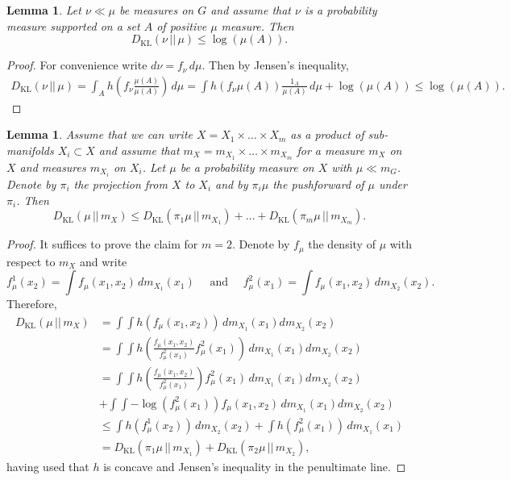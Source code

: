 \documentclass[10pt, english,oneside,reqno]{amsart}
\theoremstyle{plain}
\newtheorem{lemma}[theorem]{Lemma}
\theoremstyle{remark}
\numberwithin{equation}{section}
\numberwithin{figure}{section}
\newcommand{\Haarof}[1]{m_{#1}}
\begin{document}
\begin{lemma}\label{KLSupportBound}
    Let $\nu \ll \mu$ be measures on $G$ and assume that $\nu$ is a probability measure supported on a set $A$ of positive $\mu$ measure. Then $$D_{\mathrm{KL}}(\nu \, || \, \mu) \leq \log(\mu(A)).$$
\end{lemma}

\begin{proof}
    For convenience write $d\nu = f_{\nu}\, d\mu$. Then by Jensen's inequality,
    \begin{align*}
        D_{\mathrm{KL}}(\nu \, || \, \mu) = \int_A h\left(f_{\nu} \frac{\mu(A)}{\mu(A)} \right) \, d\mu = \int h(f_{\nu}\mu(A)) \frac{1_A}{\mu(A)} \, d\mu + \log(\mu(A)) \leq  \log(\mu(A)).
    \end{align*}
\end{proof}

\begin{lemma}\label{EntProductBound}
    Assume that we can write $X = X_1 \times \ldots \times X_m$ as a product of sub-manifolds $X_i\subset X$ and assume that $\Haarof{X} = \Haarof{X_1} \times \ldots \times \Haarof{X_m}$ for a measure $\Haarof{X}$ on $X$ and measures $\Haarof{X_i}$ on $X_i$. Let $\mu$ be a probability measure on $X$ with $\mu \ll \Haarof{G}$. Denote by $\pi_i$ the projection from $X$ to $X_i$ and by $\pi_i \mu$ the pushforward of $\mu$ under $\pi_i$. Then $$D_{\mathrm{KL}}(\mu \, || \, \Haarof{X}) \leq D_{\mathrm{KL}}(\pi_1\mu \,||\, \Haarof{X_1}) + \ldots + D_{\mathrm{KL}}(\pi_m\mu \,||\, \Haarof{X_m}).$$
\end{lemma}

\begin{proof}
    It suffices to prove the claim for $m = 2$. Denote by $f_{\mu}$ the density of $\mu$ with respect to $\Haarof{X}$ and write $$f_{\mu}^1(x_2) = \int f_{\mu}(x_1,x_2) \, d\Haarof{X_1}(x_1)  \quad \text{ and } \quad f^2_{\mu}(x_1) = \int f_{\mu}(x_1,x_2) \, d\Haarof{X_2}(x_2).$$  Therefore, 
    \begin{align*}
        D_{\mathrm{KL}}(\mu \, || \, \Haarof{X}) &= \int\int h(f_{\mu}(x_1,x_2)) \, d\Haarof{X_1}(x_1)d\Haarof{X_2}(x_2) \\
        &= \int\int h\left(\frac{f_{\mu}(x_1,x_2)}{f_{\mu}^2(x_1)}f_{\mu}^2(x_1)\right) \, d\Haarof{X_1}(x_1)d\Haarof{X_2}(x_2) \\
        &= \int\int h\left(\frac{f_{\mu}(x_1,x_2)}{f_{\mu}^2(x_1)}\right) f_{\mu}^2(x_1) \, d\Haarof{X_1}(x_1)d\Haarof{X_2}(x_2) \\
        &+ \int\int -\log(f_{\mu}^2(x_1)) f_{\mu}(x_1,x_2) \, d\Haarof{X_1}(x_1)d\Haarof{X_2}(x_2) \\
        &\leq \int h(f_{\mu}^1(x_2)) \, d\Haarof{X_2}(x_2) + \int h(f_{\mu}^2(x_1)) \, d\Haarof{X_1}(x_1) \\
        &= D_{\mathrm{KL}}(\pi_1\mu \,||\, \Haarof{X_1}) + D_{\mathrm{KL}}(\pi_2\mu \,||\, \Haarof{X_2}),
    \end{align*} having used that $h$ is concave and Jensen's inequality in the penultimate line.
\end{proof}
\end{document}
